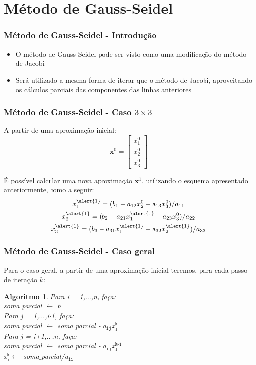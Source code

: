 \documentclass{beamer}
\theoremstyle{mystyle}
\newtheorem{algoritmo}[theorem]{Algoritmo}
\begin{document}
\section{Método de Gauss-Seidel}

\begin{frame}
	\frametitle{Método de Gauss-Seidel - Introdução}
	\begin{itemize}
		\item O método de Gauss-Seidel pode ser visto como uma modificação do método de Jacobi
		\item Será utilizado a mesma forma de iterar que o método de Jacobi, aproveitando os cálculos parciais das componentes das linhas anteriores
	\end{itemize}
\end{frame}

\begin{frame}
	\frametitle{Método de Gauss-Seidel - Caso $ 3\times3 $}
	A partir de uma aproximação inicial:
	\begin{equation*}
		\mathbf{x}^{0} = \left[
		\begin{array}{c}
			x_{1}^{0}  \\
			x_{2}^{0} \\
			x_{3}^{0}
		\end{array}
		\right]
	\end{equation*}
	
	É possível calcular uma nova aproximação $ \mathbf{x}^{1} $, utilizando o esquema apresentado anteriormente, como a seguir:
	\begin{gather*}
		x_1^{\alert{1}} = ( b_1 - a_{12} x_2^{0} - a_{13} x_3^{0} ) / a_{11}\\
		x_2^{\alert{1}} = ( b_2 - a_{21} x_1^{\alert{1}} - a_{23} x_3^{0} ) / a_{22}\\
		x_3^{\alert{1}} = ( b_3 - a_{31} x_1^{\alert{1}} - a_{32} x_2^{\alert{1}} ) / a_{33}
	\end{gather*}
\end{frame}

\begin{frame}
	\frametitle{Método de Gauss-Seidel - Caso geral}
	Para o caso geral, a partir de uma aproximação inicial teremos, \alert{para cada passo de iteração $ k $}:
	\begin{algoritmo}
		Para i = 1,$\ldots$,n, faça:\\
		\quad soma$ \_ $parcial $\leftarrow$ b$ _{\texttt{i}} $\\
		\quad Para j = 1,$\ldots$,i-1, faça:\\
		\quad\quad soma$ \_ $parcial $\leftarrow$ soma$ \_ $parcial - a$ _{\texttt{ij}} $x$ _{\texttt{j}}^{\texttt{k}} $\\
		\quad Para j = i+1,$\ldots$,n, faça:\\
		\quad\quad soma$ \_ $parcial $\leftarrow$ soma$ \_ $parcial - a$ _{\texttt{ij}} $x$ _{\texttt{j}}^{\texttt{k-1}} $\\
		\quad x$ _{\texttt{i}}^{\texttt{k}} \leftarrow$ soma$ \_ $parcial/a$ _{\texttt{ii}} $
	\end{algoritmo}
\end{frame}
\end{document}
